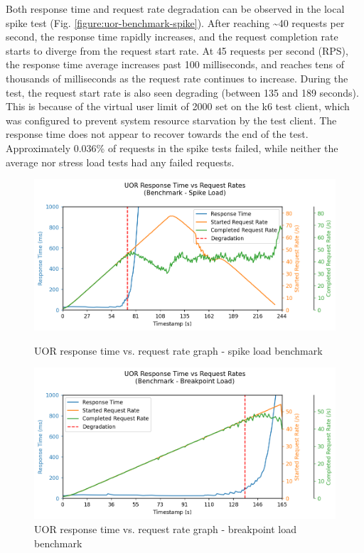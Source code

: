 Both response time and request rate degradation can be observed in the local spike test (Fig. \ref{figure:uor-benchmark-spike}). After reaching \textasciitilde40 requests per second, the response time rapidly increases, and the request completion rate starts to diverge from the request start rate. At 45 requests per second (RPS), the response time average increases past 100 milliseconds, and reaches tens of thousands of milliseconds as the request rate continues to increase. During the test, the request start rate is also seen degrading (between 135 and 189 seconds). This is because of the virtual user limit of 2000 set on the k6 test client, which was configured to prevent system resource starvation by the test client. The response time does not appear to recover towards the end of the test. Approximately 0.036\% of requests in the spike tests failed, while neither the average nor stress load tests had any failed requests.

\begin{figure}[h]
    \centering
    \begin{minipage}{.47\textwidth}
        \centering
        \includegraphics[width=\linewidth]{figures/uor-benchmark-spike.png}
        \caption{UOR response time vs. request rate graph - spike load benchmark}
        \label{figure:uor-benchmark-spike}
    \end{minipage}%
    \hspace{0.05\textwidth} %
    \begin{minipage}{.47\textwidth}
        \centering
        \includegraphics[width=\linewidth]{figures/uor-benchmark-breakpoint.png}
        \caption{UOR response time vs. request rate graph - breakpoint load benchmark}
        \label{figure:uor-benchmark-breakpoint}
    \end{minipage}
\end{figure}

